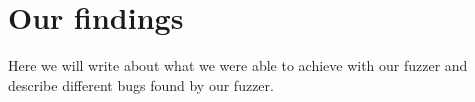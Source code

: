 \chapter{Our findings}
Here we will write about what we were able to achieve with our fuzzer and describe different bugs found by our fuzzer.
